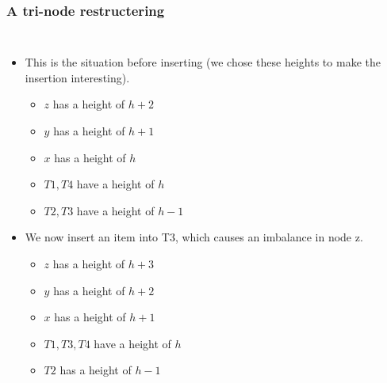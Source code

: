 \begin{frame}
	\frametitle{A tri-node restructering}
	\begin{columns}[T]
		\begin{itemize}
			\item This is the situation before inserting (we chose these heights to make the insertion interesting).
				
				\begin{itemize}
					\item $z$ has a height of $h+2$
					\item $y$ has a height of $h+1$
					\item $x$ has a height of $h$
					\item $T1,T4$ have a height of $h$
					\item $T2,T3$ have a height of $h-1$
				\end{itemize}
				
			\item We now insert an item into T3, which causes an imbalance in node z.
				
				\begin{itemize}
					\item $z$ has a height of $h+3$
					\item $y$ has a height of $h+2$
					\item $x$ has a height of $h+1$
					\item $T1,T3,T4$ have a height of $h$
					\item $T2$ has a height of $h-1$
				\end{itemize}
		\end{itemize}
			
	\end{columns}
\end{frame}


